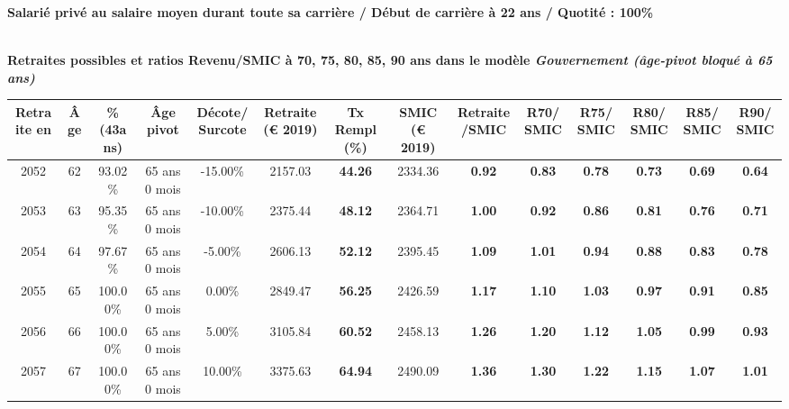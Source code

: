 {\bf \noindent Salarié privé au salaire moyen durant toute sa carrière / Début de carrière à 22 ans / Quotité : 100\%}  ~ 

 ~\\{\bf \noindent Retraites possibles et ratios Revenu/SMIC à 70, 75, 80, 85, 90 ans dans le modèle \emph{Gouvernement (âge-pivot bloqué à 65 ans)}}  
 
\begin{adjustbox}{max width=\textwidth} 
\begin{tabular}[htb]{|c|c||c|c|c||c|c||c|c||c|c|c|c|c|} 
\hline 
 Retraite en &  Âge &  \%(43ans) &  Âge pivot &  Décote/Surcote &  Retraite (\euro{} 2019) &  Tx Rempl(\%) &  SMIC (\euro{} 2019) &  Retraite/SMIC &  R70/SMIC &  R75/SMIC &  R80/SMIC &  R85/SMIC &  R90/SMIC \\ 
\hline \hline 
 2052 &  62 &  93.02\% &  65 ans 0 mois &  -15.00\% &  2157.03 &  {\bf 44.26} &  2334.36 &  {\bf {\color{red} 0.92}} &  {\bf {\color{red} 0.83}} &  {\bf {\color{red} 0.78}} &  {\bf {\color{red} 0.73}} &  {\bf {\color{red} 0.69}} &  {\bf {\color{red} 0.64}} \\ 
\hline 
 2053 &  63 &  95.35\% &  65 ans 0 mois &  -10.00\% &  2375.44 &  {\bf 48.12} &  2364.71 &  {\bf 1.00} &  {\bf {\color{red} 0.92}} &  {\bf {\color{red} 0.86}} &  {\bf {\color{red} 0.81}} &  {\bf {\color{red} 0.76}} &  {\bf {\color{red} 0.71}} \\ 
\hline 
 2054 &  64 &  97.67\% &  65 ans 0 mois &  -5.00\% &  2606.13 &  {\bf 52.12} &  2395.45 &  {\bf 1.09} &  {\bf 1.01} &  {\bf {\color{red} 0.94}} &  {\bf {\color{red} 0.88}} &  {\bf {\color{red} 0.83}} &  {\bf {\color{red} 0.78}} \\ 
\hline 
 2055 &  65 &  100.00\% &  65 ans 0 mois &  0.00\% &  2849.47 &  {\bf 56.25} &  2426.59 &  {\bf 1.17} &  {\bf 1.10} &  {\bf 1.03} &  {\bf {\color{red} 0.97}} &  {\bf {\color{red} 0.91}} &  {\bf {\color{red} 0.85}} \\ 
\hline 
 2056 &  66 &  100.00\% &  65 ans 0 mois &  5.00\% &  3105.84 &  {\bf 60.52} &  2458.13 &  {\bf 1.26} &  {\bf 1.20} &  {\bf 1.12} &  {\bf 1.05} &  {\bf {\color{red} 0.99}} &  {\bf {\color{red} 0.93}} \\ 
\hline 
 2057 &  67 &  100.00\% &  65 ans 0 mois &  10.00\% &  3375.63 &  {\bf 64.94} &  2490.09 &  {\bf 1.36} &  {\bf 1.30} &  {\bf 1.22} &  {\bf 1.15} &  {\bf 1.07} &  {\bf 1.01} \\ 
\hline 
\hline 
\end{tabular} 
\end{adjustbox} 
 
